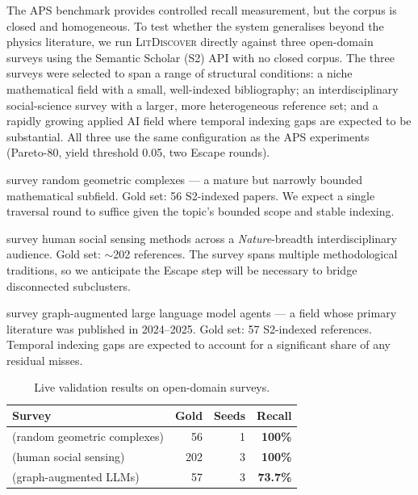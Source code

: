\documentclass[conference]{IEEEtran}
\newcommand{\ldiscover}{\textsc{LitDiscover}}
\begin{document}
The APS benchmark provides controlled recall measurement, but the corpus is closed and
homogeneous. To test whether the system generalises beyond the physics literature, we run
\ldiscover{} directly against three open-domain surveys using the Semantic Scholar (S2) API
with no closed corpus. The three surveys were selected to span a range of structural
conditions: a niche mathematical field with a small, well-indexed bibliography; an
interdisciplinary social-science survey with a larger, more heterogeneous reference set;
and a rapidly growing applied AI field where temporal indexing gaps are expected to be
substantial. All three use the same configuration as the APS experiments (Pareto-80, yield
threshold 0.05, two Escape rounds).

\citet{Bobrowski2018} survey random geometric complexes --- a mature but narrowly bounded
mathematical subfield. Gold set: 56 S2-indexed papers. We expect a single traversal round
to suffice given the topic's bounded scope and stable indexing.

\citet{Galesic2021} survey human social sensing methods across a \textit{Nature}-breadth
interdisciplinary audience. Gold set: $\sim$202 references. The survey spans multiple
methodological traditions, so we anticipate the Escape step will be necessary to bridge
disconnected subclusters.

\citet{Liu2025} survey graph-augmented large language model agents --- a field whose primary
literature was published in 2024--2025. Gold set: 57 S2-indexed references. Temporal
indexing gaps are expected to account for a significant share of any residual misses.

\begin{table}[h]
\centering
\caption{Live validation results on open-domain surveys.}
\label{tab:live}
\begin{tabular}{@{}p{3.4cm}rrr@{}}
\toprule
Survey & Gold & Seeds & Recall \\
\midrule
\citet{Bobrowski2018} \newline (random geometric complexes) & 56 & 1 & \textbf{100\%} \\
\addlinespace
\citet{Galesic2021} \newline (human social sensing) & 202 & 3 & \textbf{100\%} \\
\addlinespace
\citet{Liu2025} \newline (graph-augmented LLMs) & 57 & 3 & \textbf{73.7\%} \\
\bottomrule
\end{tabular}
\end{table}
\end{document}
